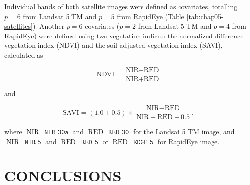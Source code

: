 
Individual bands of both satellite images were defined as covariates, totalling $p = 6$ from Landsat 5 TM and 
$p = 5$ from RapidEye (Table \ref{tab:chap05-satellites}). Another $p = 6$ covariates ($p = 2$ from Landsat 5 
TM and $p = 4$ from RapidEye) were defined using two vegetation indices: the normalized difference vegetation 
index (NDVI) and the soil-adjusted vegetation index (SAVI), calculated as

\begin{equation}\label{eqn:ndvi}
 \text{NDVI} = \frac{\text{NIR} - \text{RED}}{\text{NIR} + \text{RED}}
\end{equation}

\noindent and 

\begin{equation}\label{eqn:savi}
  \text{SAVI} = (1.0 + 0.5) \times \frac{\text{NIR} - \text{RED}}{\text{NIR} + \text{RED} + 0.5},
\end{equation}

\noindent where $\text{NIR} = \texttt{NIR\_30a}$ and $\text{RED} = \texttt{RED\_30}$ for the Landsat 5 TM 
image, and $\text{NIR} = \texttt{NIR\_5}$ and $\text{RED} = \texttt{RED\_5}$ or $\text{RED} = \texttt{EDGE\_5}$ 
for RapidEye image.

\section{CONCLUSIONS}

